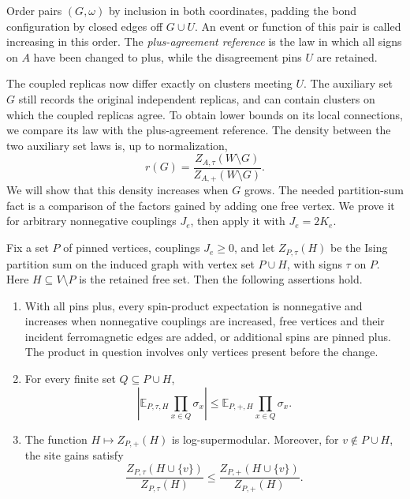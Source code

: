 Order pairs $(G,\omega)$ by inclusion in both coordinates, padding the
bond configuration by closed edges off $G\cup U$. An event or function of
this pair is called increasing in this order. The \emph{plus-agreement
reference} is the law in which all signs on $A$ have been changed to plus,
while the disagreement pins $U$ are retained.

The coupled replicas now differ exactly on clusters meeting $U$.
The auxiliary set $G$ still records the original independent replicas,
and can contain clusters on which the coupled replicas agree. To obtain
lower bounds on its local connections, we compare its law with the
plus-agreement reference. The density between the two auxiliary set laws
is, up to normalization,
\[
 r(G)=\frac{Z_{A,\tau}(W\setminus G)}{Z_{A,+}(W\setminus G)}.
\]
We will show that this density increases when $G$ grows. The needed
partition-sum fact is a comparison of the factors gained by adding one
free vertex. We prove it for arbitrary nonnegative couplings $J_e$,
then apply it with $J_e=2K_e$.

\begin{lemma}
\label{tr:site-gain}
Fix a set $P$ of pinned vertices, couplings $J_e\geq0$, and let
$Z_{P,\tau}(H)$ be the Ising partition sum on the induced graph with vertex
set $P\cup H$, with signs $\tau$ on $P$. Here $H\subseteq V\setminus P$ is
the retained free set. Then the following assertions hold.
\begin{enumerate}
\item With all pins plus, every spin-product expectation is nonnegative and
increases when nonnegative couplings are increased, free vertices and their
incident ferromagnetic edges are added, or additional spins are pinned plus.
The product in question involves only vertices present before the change.
\item For every finite set $Q\subseteq P\cup H$,
\begin{equation}
\label{tr:mixed-product}
 \left|\mathbb E_{P,\tau,H}\prod_{x\in Q}\sigma_x\right|
 \leq \mathbb E_{P,+,H}\prod_{x\in Q}\sigma_x.
\end{equation}
\item The function $H\mapsto Z_{P,+}(H)$ is log-supermodular. Moreover,
for $v\notin P\cup H$, the site gains satisfy
\begin{equation}
\label{tr:gain-comparison}
 \frac{Z_{P,\tau}(H\cup\{v\})}{Z_{P,\tau}(H)}
 \leq
 \frac{Z_{P,+}(H\cup\{v\})}{Z_{P,+}(H)}.
\end{equation}
\end{enumerate}
\end{lemma}

